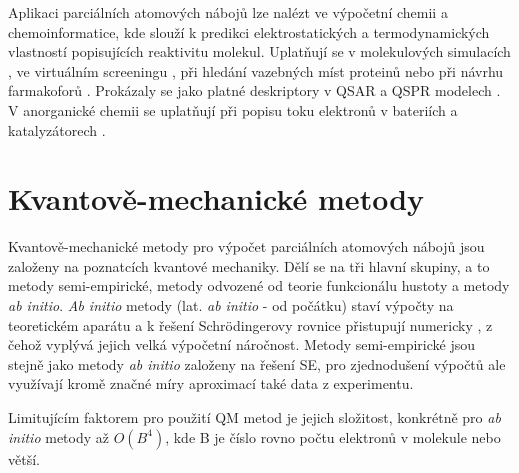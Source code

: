 Aplikaci parciálních atomových nábojů lze nalézt ve výpočetní chemii a chemoinformatice, kde slouží k predikci elektrostatických a termodynamických vlastností popisujících reaktivitu molekul. Uplatňují se v molekulových simulacích \cite{molsimul}, ve virtuálním screeningu \cite{virtscreen}, při hledání vazebných míst proteinů nebo při návrhu farmakoforů \cite{farmak}. Prokázaly se jako platné deskriptory v QSAR a QSPR modelech \cite{Ghaf:QSAR, QSPR2}. V anorganické chemii se uplatňují při popisu toku elektronů v bateriích a katalyzátorech \cite{innorg}. 


\section{Kvantově-mechanické metody}
Kvantově-mechanické metody pro výpočet parciálních atomových nábojů jsou založeny na poznatcích kvantové mechaniky. Dělí se na tři hlavní skupiny, a to metody semi-empirické, metody odvozené od teorie funkcionálu hustoty a metody \textit{ab initio}. \textit{Ab initio} metody (lat. \textit{ab initio} - od počátku) staví výpočty na teoretickém aparátu a k řešení Schrödingerovy rovnice přistupují numericky%
, z čehož vyplývá jejich velká výpočetní náročnost. Metody semi-empirické jsou stejně jako metody \textit{ab initio} založeny na řešení SE, pro zjednodušení výpočtů ale využívají kromě značné míry aproximací také data z experimentu. 

Limitujícím faktorem pro použití QM metod je jejich složitost, konkrétně pro \textit{ab initio} metody až $O(B^4)$, kde B je číslo rovno počtu elektronů v molekule nebo větší. 

